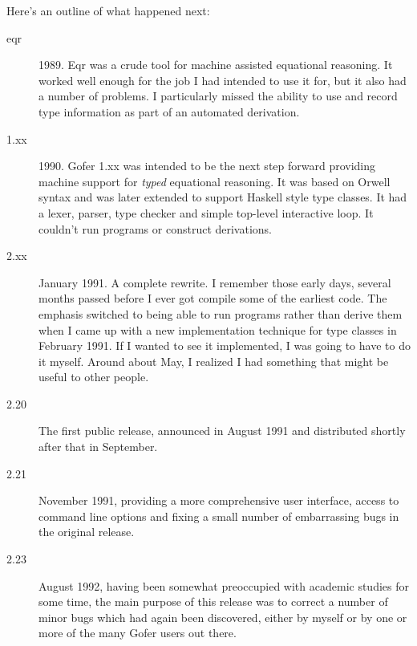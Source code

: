 Here's an outline of what happened next:
\begin{description}
   \item[eqr]   1989.  Eqr was a crude tool for machine assisted equational
         reasoning.  It worked well enough for the job I had intended
         to use it for, but it also had a number of problems.  I
         particularly missed the ability to use and record type
         information as part of an automated derivation.

   \item[1.xx]  1990.  Gofer 1.xx was intended to be the next step forward
         providing machine support for {\em typed} equational reasoning.
         It was based on Orwell syntax and was later extended to
         support Haskell style type classes.  It had a lexer, parser,
         type checker and simple top-level interactive loop.  It
         couldn't run programs or construct derivations.

   \item[2.xx]  January 1991.  A complete rewrite.  I remember those early
         days, several months passed before I ever got compile some of
         the earliest code.  The emphasis switched to being able to run
         programs rather than derive them when I came up with a new
         implementation technique for type classes in February 1991.
         If I wanted to see it implemented, I was going to have to do
         it myself.  Around about May, I realized I had something that
         might be useful to other people.

   \item[2.20]  The first public release, announced in August 1991 and
         distributed shortly after that in September.

   \item[2.21]  November 1991, providing a more comprehensive user
	 interface, access to command line options and fixing a
	 small number of embarrassing bugs in the original release.

   \item[2.23]  August 1992, having been somewhat preoccupied with academic
	 studies for some time, the main purpose of this release
	 was to correct a number of minor bugs which had again been
	 discovered, either by myself or by one or more of the many
	 Gofer users out there.


\end{description}
